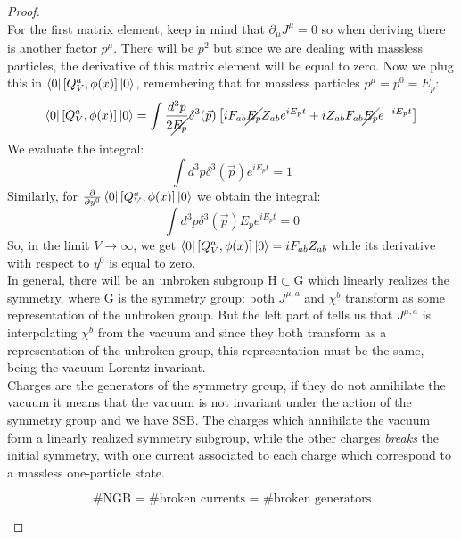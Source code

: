 \documentclass[../main.tex]{subfiles}
\begin{document}
\begin{proof}
\begin{equation}
\end{equation}
For the first matrix element, keep in mind that $\partial_\mu J^\mu=0$ so when deriving there is another factor $p^\mu$. There will be $p^2$ but since we are dealing with massless particles, the derivative of this matrix element will be equal to zero. Now we plug this in $\bra{0}[Q_V^a,\phi(x)]\ket{0}$, remembering that for massless particles $p^\mu=p^0=E_p$:
\[
\bra{0}[Q_V^a,\phi(x)]\ket{0}=\int\frac{d^3p}{2\cancel{E_p}}\delta^3(\Vec{p})\left[iF_{ab}\cancel{E_p}Z_{ab}e^{iE_pt}+iZ_{ab}F_{ab}\cancel{E_p}e^{-iE_pt}\right]
\]
We evaluate the integral:
\[
\int d^3p\delta^3(\Vec{p})e^{iE_pt}=1
\]
Similarly, for $\frac{\partial}{\partial y^0}\bra{0}[Q_V^a,\phi(x)]\ket{0}$ we obtain the integral:
\[
\int d^3p\delta^3(\Vec{p})E_pe^{iE_pt}=0
\]
So, in the limit $V\to\infty$, we get
$\bra{0}[Q_V^a,\phi(x)]\ket{0}=iF_{ab}Z_{ab}$ while its derivative with respect to $y^0$ is equal to zero.\\
In general, there will be an unbroken subgroup H$\subset$G which linearly realizes the symmetry, where G is the symmetry group: both $J^{\mu,a}$ and $\chi^b$ transform as some representation of the unbroken group. But the left part of  tells us that $J^{\mu,a}$ is interpolating $\chi^b$ from the vacuum and since they both transform as a representation of the unbroken group, this representation must be the same, being the vacuum Lorentz invariant.\\
Charges are the generators of the symmetry group, if they do not annihilate the vacuum it means that the vacuum is not invariant under the action of the symmetry group and we have SSB. The charges which annihilate the vacuum form a linearly realized symmetry subgroup, while the other charges \textit{breaks} the initial symmetry, with one current associated to each charge which correspond to a massless one-particle state.
\begin{kaobox}[frametitle=\#NGB]
\[
\text{\#NGB = \#broken currents = \#broken generators}
\]
\end{kaobox}
\end{proof}
\end{document}

